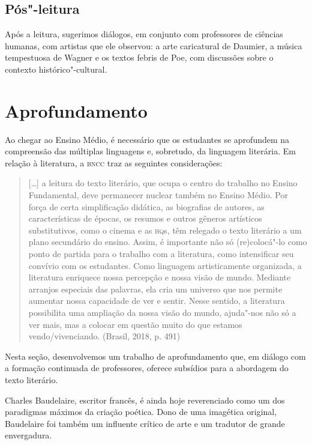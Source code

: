 \documentclass[12pt]{extarticle}
\begin{document}
\subsection{Pós"-leitura}

Após a leitura, sugerimos diálogos, em conjunto com
professores de ciências humanas, com artistas que ele observou: a arte
caricatural de Daumier, a música tempestuosa de Wagner e os textos
febris de Poe, com discussões sobre o contexto histórico"-cultural.

\section{Aprofundamento}

Ao chegar ao Ensino Médio, é necessário que os estudantes se aprofundem
na compreensão das múltiplas linguagens e, sobretudo, da linguagem
literária. Em relação à literatura, a \textsc{bncc} traz as seguintes
considerações:

\begin{quote}
{[}\ldots{}{]} a leitura do texto literário, que ocupa o centro do trabalho
no Ensino Fundamental, deve permanecer nuclear também no Ensino Médio.
Por força de certa simplificação didática, as biografias de autores, as
características de épocas, os resumos e outros gêneros artísticos
substitutivos, como o cinema e as \textsc{hq}s, têm relegado o texto literário a
um plano secundário do ensino. Assim, é importante não só (re)colocá"-lo
como ponto de partida para o trabalho com a literatura, como
intensificar seu convívio com os estudantes. Como linguagem
artisticamente organizada, a literatura enriquece nossa percepção e
nossa visão de mundo. Mediante arranjos especiais das palavras, ela cria
um universo que nos permite aumentar nossa capacidade de ver e sentir.
Nesse sentido, a literatura possibilita uma ampliação da nossa visão do
mundo, ajuda"-nos não só a ver mais, mas a colocar em questão muito do
que estamos vendo/vivenciando. (Brasil, 2018, p. 491)
\end{quote}

Nesta seção, desenvolvemos um trabalho de aprofundamento que, em diálogo
com a formação continuada de professores, oferece subsídios para a
abordagem do texto literário.

Charles Baudelaire, escritor francês, é ainda hoje reverenciado como
um dos paradigmas máximos da criação poética.
Dono de uma imagética original, Baudelaire foi também um influente
crítico de arte e um tradutor de grande envergadura.
\end{document}
